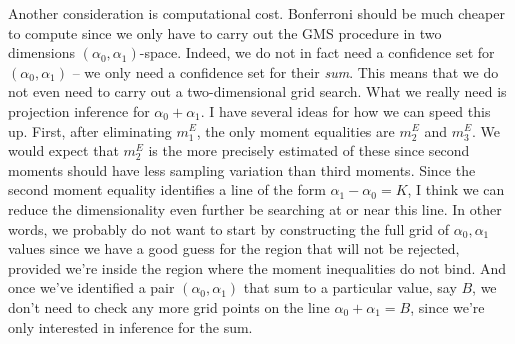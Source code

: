 \documentclass[12pt]{article}
\begin{document}
Another consideration is computational cost.
Bonferroni should be much cheaper to compute since we only have to carry out the GMS procedure in two dimensions $(\alpha_0, \alpha_1)$-space.
Indeed, we do not in fact need a confidence set for $(\alpha_0, \alpha_1)$ -- we only need a confidence set for their \emph{sum}.
This means that we do not even need to carry out a two-dimensional grid search.
What we really need is projection inference for $\alpha_0 + \alpha_1$.
I have several ideas for how we can speed this up.
First, after eliminating $m_1^E$, the only moment equalities are $m_2^E$ and $m_3^E$. 
We would expect that $m_2^E$ is the more precisely estimated of these since second moments should have less sampling variation than third moments.
Since the second moment equality identifies a line of the form $\alpha_1 - \alpha_0 = K$, I think we can reduce the dimensionality even further be searching at or near this line.
In other words, we probably do not want to start by constructing the full grid of $\alpha_0, \alpha_1$ values since we have a good guess for the region that will not be rejected, provided we're inside the region where the moment inequalities do not bind.
And once we've identified a pair $(\alpha_0, \alpha_1)$ that sum to a particular value, say $B$, we don't need to check any more grid points on the line $\alpha_0 + \alpha_1 = B$, since we're only interested in inference for the sum.
\end{document}

